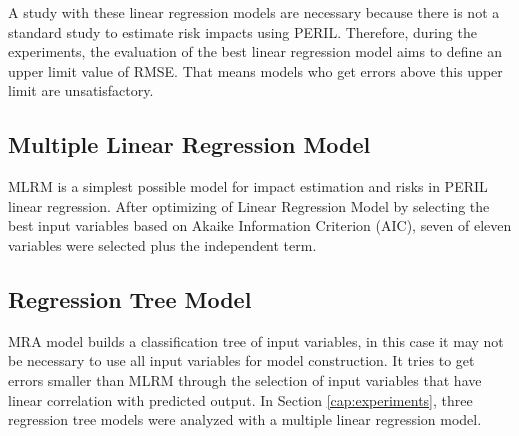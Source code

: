A study with these linear regression models are necessary because there is not a standard study to estimate risk impacts using PERIL. Therefore, during the experiments, the evaluation of the best linear regression model aims to define an upper limit value of RMSE. That means models who get errors above this upper limit are unsatisfactory.

\subsection{Multiple Linear Regression Model}

MLRM is a simplest possible model for impact estimation and risks in PERIL linear regression. After optimizing of Linear Regression Model by selecting the best input variables based on Akaike Information Criterion (AIC), seven of eleven variables were selected plus the independent term.

\subsection{Regression Tree Model}

MRA model builds a classification tree of input variables, in this case it may not be necessary to use all input variables for model construction. It tries to get errors smaller than MLRM through the selection of input variables that have linear correlation with predicted output. In Section \ref{cap:experiments}, three regression tree models were analyzed with a multiple linear regression model.

